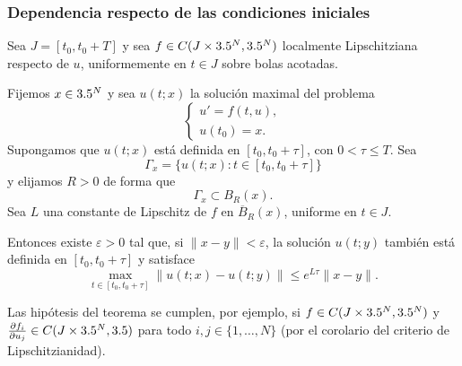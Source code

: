 \subsubsection{Dependencia respecto de las condiciones iniciales}

\begin{teorema}
    Sea $J=[t_0,t_0+T]$ y sea $f\in C(J\times3.5^N,3.5^N)$ localmente Lipschitziana respecto de $u$, uniformemente en $t\in J$ sobre bolas acotadas.

    Fijemos $x\in3.5^N$ y sea $u(t;x)$ la solución maximal del problema
    \[
        \begin{cases}
            u'=f(t,u),\\
            u(t_0)=x.
        \end{cases}
    \]
    Supongamos que $u(t;x)$ está definida en $[t_0,t_0+\tau]$, con $0<\tau\leq T$. Sea
    \[
        \Gamma_x=\{u(t;x):t\in[t_0,t_0+\tau]\}
    \]
    y elijamos $R>0$ de forma que
    \[
        \Gamma_x\subset B_R(x).
    \]
    Sea $L$ una constante de Lipschitz de $f$ en $\overline{B}_R(x)$, uniforme en $t\in J$.

    Entonces existe $\varepsilon>0$ tal que, si $\|x-y\|<\varepsilon$, la solución $u(t;y)$ también está definida en $[t_0,t_0+\tau]$ y satisface
    \[
        \max_{t\in[t_0,t_0+\tau]}
        \|u(t;x)-u(t;y)\|
        \leq e^{L\tau}\|x-y\|.
    \]
\end{teorema}

\begin{observación}
    Las hipótesis del teorema se cumplen, por ejemplo, si $f \in C(J \times 3.5^N, 3.5^N)$ y $\frac{\partial f_i}{\partial u_j} \in C(J \times 3.5^N, 3.5)$ para todo $i, j \in \{1, \ldots, N\}$ (por el corolario del criterio de Lipschitzianidad).
\end{observación}

